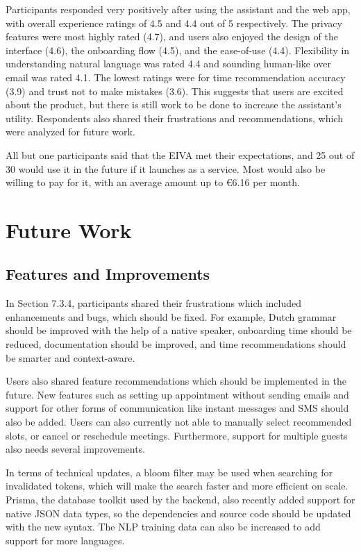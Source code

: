 \documentclass{article}
\begin{document}
Participants responded very positively after using the assistant and the web app, with overall experience ratings of 4.5 and 4.4 out of 5 respectively. The privacy features were most highly rated (4.7), and users also enjoyed the design of the interface (4.6), the onboarding flow (4.5), and the ease-of-use (4.4). Flexibility in understanding natural language was rated 4.4 and sounding human-like over email was rated 4.1. The lowest ratings were for time recommendation accuracy (3.9) and trust not to make mistakes (3.6).  This suggests that users are excited about the product, but there is still work to be done to increase the assistant's utility. Respondents also shared their frustrations and recommendations, which were analyzed for future work.

All but one participants said that the EIVA met their expectations, and 25 out of 30 would use it in the future if it launches as a service. Most would also be willing to pay for it, with an average amount up to €6.16 per month.

\newpage

\section{Future Work}

\subsection{Features and Improvements}

In Section 7.3.4, participants shared their frustrations which included enhancements and bugs, which should be fixed. For example, Dutch grammar should be improved with the help of a native speaker, onboarding time should be reduced, documentation should be improved, and time recommendations should be smarter and context-aware.

Users also shared feature recommendations which should be implemented in the future. New features such as setting up appointment without sending emails and support for other forms of communication like instant messages and SMS should also be added. Users can also currently not able to manually select recommended slots, or cancel or reschedule meetings. Furthermore, support for multiple guests also needs several improvements.

In terms of technical updates, a bloom filter may be used when searching for invalidated tokens, which will make the search faster and more efficient on scale. Prisma, the database toolkit used by the backend, also recently added support for native JSON data types, so the dependencies and source code should be updated with the new syntax. The NLP training data can also be increased to add support for more languages.
\end{document}
